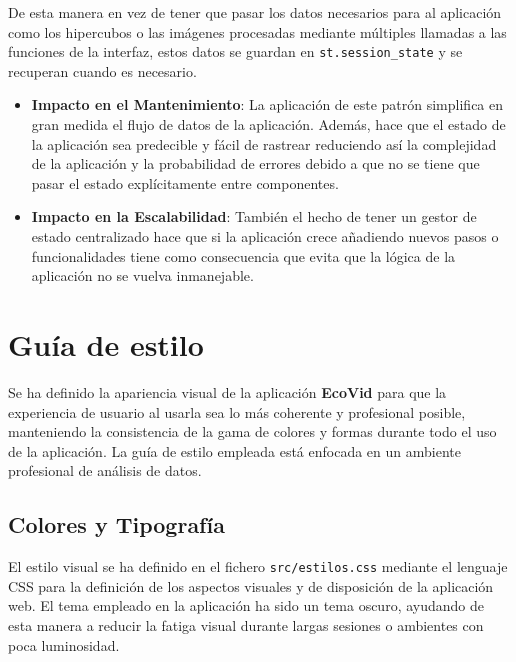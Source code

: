 De esta manera en vez de tener que pasar los datos necesarios para al aplicación como los hipercubos o las imágenes procesadas mediante múltiples llamadas a las funciones de la interfaz, estos datos se guardan en \verb|st.session_state| y se recuperan cuando es necesario.

\begin{itemize}
    \item \textbf{Impacto en el Mantenimiento}: La aplicación de este patrón simplifica en gran medida el flujo de datos de la aplicación. Además, hace que el estado de la aplicación sea predecible y fácil de rastrear reduciendo así la complejidad de la aplicación y la probabilidad de errores debido a que no se tiene que pasar el estado explícitamente entre componentes.

    \item \textbf{Impacto en la Escalabilidad}: También el hecho de tener un gestor de estado centralizado hace que si la aplicación crece añadiendo nuevos pasos o funcionalidades tiene como consecuencia que evita que la lógica de la aplicación no se vuelva inmanejable.
\end{itemize}

\section{Guía de estilo}
Se ha definido la apariencia visual de la aplicación \textbf{EcoVid} para que la experiencia de usuario al usarla sea lo más coherente y profesional posible, manteniendo la consistencia de la gama de colores y formas durante todo el uso de la aplicación. La guía de estilo empleada está enfocada en un ambiente profesional de análisis de datos.


\subsection{Colores y Tipografía}
El estilo visual se ha definido en el fichero \texttt{src/estilos.css} mediante el lenguaje CSS para la definición de los aspectos visuales y de disposición de la aplicación web. El tema empleado en la aplicación ha sido un tema oscuro, ayudando de esta manera a reducir la fatiga visual durante largas sesiones o ambientes con poca luminosidad.

